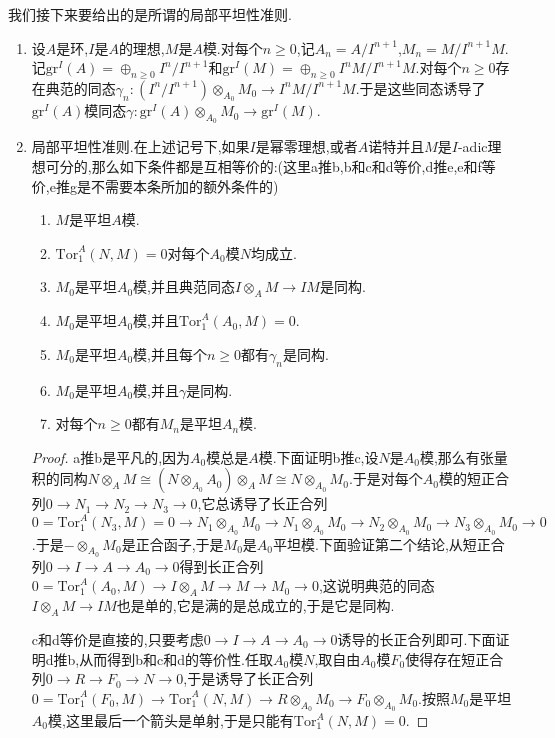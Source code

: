 我们接下来要给出的是所谓的局部平坦性准则.
\begin{enumerate}
	\item 设$A$是环,$I$是$A$的理想,$M$是$A$模.对每个$n\ge0$,记$A_n=A/I^{n+1}$,$M_n=M/I^{n+1}M$.记$\mathrm{gr}^I(A)=\oplus_{n\ge0}I^n/I^{n+1}$和$\mathrm{gr}^I(M)=\oplus_{n\ge0}I^nM/I^{n+1}M$.对每个$n\ge0$存在典范的同态$\gamma_n:(I^n/I^{n+1})\otimes_{A_0}M_0\to I^nM/I^{n+1}M$.于是这些同态诱导了$\mathrm{gr}^I(A)$模同态$\gamma:\mathrm{gr}^I(A)\otimes_{A_0}M_0\to\mathrm{gr}^I(M)$.
	\item 局部平坦性准则.在上述记号下,如果$I$是幂零理想,或者$A$诺特并且$M$是$I$-adic理想可分的,那么如下条件都是互相等价的:(这里a推b,b和c和d等价,d推e,e和f等价,e推g是不需要本条所加的额外条件的)
	\begin{enumerate}
		\item $M$是平坦$A$模.
		\item $\mathrm{Tor}_1^A(N,M)=0$对每个$A_0$模$N$均成立.
		\item $M_0$是平坦$A_0$模,并且典范同态$I\otimes_AM\to IM$是同构.
		\item $M_0$是平坦$A_0$模,并且$\mathrm{Tor}_1^A(A_0,M)=0$.
		\item $M_0$是平坦$A_0$模,并且每个$n\ge0$都有$\gamma_n$是同构.
		\item $M_0$是平坦$A_0$模,并且$\gamma$是同构.
		\item 对每个$n\ge0$都有$M_n$是平坦$A_n$模.
	\end{enumerate}
	\begin{proof}
		
		a推b是平凡的,因为$A_0$模总是$A$模.下面证明b推c,设$N$是$A_0$模,那么有张量积的同构$N\otimes_AM\cong(N\otimes_{A_0}A_0)\otimes_AM\cong N\otimes_{A_0}M_0$.于是对每个$A_0$模的短正合列$0\to N_1\to N_2\to N_3\to0$,它总诱导了长正合列$0=\mathrm{Tor}_1^A(N_3,M)=0\to N_1\otimes_{A_0}M_0\to N_1\otimes_{A_0}M_0\to N_2\otimes_{A_0}M_0\to N_3\otimes_{A_0}M_0\to0$.于是$-\otimes_{A_0}M_0$是正合函子,于是$M_0$是$A_0$平坦模.下面验证第二个结论,从短正合列$0\to I\to A\to A_0\to0$得到长正合列$0=\mathrm{Tor}_1^A(A_0,M)\to I\otimes_AM\to M\to M_0\to0$,这说明典范的同态$I\otimes_AM\to IM$也是单的,它是满的是总成立的,于是它是同构.
		
		c和d等价是直接的,只要考虑$0\to I\to A\to A_0\to0$诱导的长正合列即可.下面证明d推b,从而得到b和c和d的等价性.任取$A_0$模$N$,取自由$A_0$模$F_0$使得存在短正合列$0\to R\to F_0\to N\to0$,于是诱导了长正合列$0=\mathrm{Tor}_1^A(F_0,M)\to\mathrm{Tor}_1^A(N,M)\to R\otimes_{A_0}M_0\to F_0\otimes_{A_0}M_0$.按照$M_0$是平坦$A_0$模,这里最后一个箭头是单射,于是只能有$\mathrm{Tor}_1^A(N,M)=0$.
		

\end{proof}
\end{enumerate}
